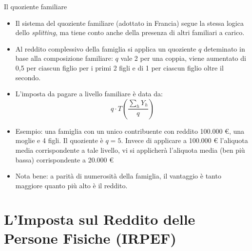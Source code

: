 \documentclass[aspectratio=64,11pt]{beamer}
\newcommand\€{\,\text{€}}
\begin{document}
\begin{frame}{Il quoziente familiare}
\begin{itemize}
\item Il sistema del \alert{quoziente familiare} (adottato in Francia) segue la stessa
logica dello \emph{splitting}, ma tiene conto anche della presenza di altri
familiari a carico.
\item Al reddito complessivo della famiglia si applica un quoziente $q$ deteminato
in base alla composizione familiare: $q$ vale 2 per una coppia, viene aumentato di 0,5 per ciascun figlio per i primi 2 figli e di 1 per ciascun figlio oltre il secondo.
\item L'imposta da pagare a livello familiare è data da:
\begin{equation*}
  q\cdot T\left( \frac{\sum_{h}Y_{h}}{q} \right)
\end{equation*}
\item Esempio: una famiglia con un unico contribuente con reddito 100.000 €, una
moglie e 4 figli. Il quoziente è $q=5$. Invece di applicare a 100.000 €
l'aliquota media corrispondente a tale livello, vi si applicherà l'aliquota
media (ben più bassa) corrispondente a 20.000 €
\item Nota bene: a parità di numerosità della famiglia, il vantaggio è tanto
maggiore quanto più alto è il reddito.
\end{itemize}
\end{frame}

\section{L'Imposta sul Reddito delle Persone Fisiche (IRPEF)}
\end{document}
